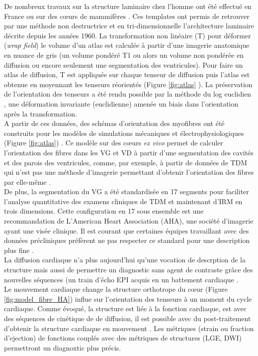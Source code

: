 De nombreux travaux sur la structure laminaire chez l’homme ont été effectué en France \cite{Lombaert2012} \cite{} ou sur des cœurs de mammifères \cite{Magat2022} \cite{Smerup2008}. Ces templates ont permis de retrouver par une méthode non destructrice et en tri-dimensionnelle l’architecture laminaire décrite depuis les années 1960\cite{STREETER1969}. La transformation non linéaire (T)  pour déformer (\textit{wrap field}) le volume d’un atlas est calculée à partir d’une imagerie anatomique en nuance de gris (un volume pondéré T1 ou alors un volume non pondérée en diffusion ou encore seulement une segmentation des ventricules).  Pour faire un atlas de diffusion, T est appliquée sur chaque tenseur de diffusion puis l’atlas est obtenue en moyennant les tenseurs réorientés (Figure \ref{fig:atlas} ). La préservation de l’orientation des tenseurs a été rendu possible par la méthode du log euclidien \cite{Arsigny2006}, une déformation invariante (euclidienne) amenée un biais dans l’orientation après la transformation.
\\
A partir de ces données, des schémas d’orientation \cite{Bayer2012} des myofibres ont été construits pour les modèles de simulations mécaniques et électrophysiologiques (Figure \ref{fig:atlas}) \cite{Chapelle2009} \cite{Sermesant2006}. Ce modèle sur des cœurs \textit{ex vivo} permet de calculer l’orientation des fibres dans les VG et VD à partir d’une segmentation des cavités et des parois des ventricules, comme, par exemple, à partir de données de TDM qui n’est pas une méthode d’imagerie permettant d’obtenir l’orientation des fibres par elle-même \cite{Sermesant2006}.
\\
De plus, la segmentation du VG a été standardisée en 17 segments \cite{Cerqueira2002} pour faciliter l’analyse quantitative des examens cliniques de TDM et maintenant d’IRM en trois dimensions.  Cette configuration en 17 sous ensemble est une recommandation de L’American Heart Association (AHA), une société d’imagerie ayant une visée clinique. Il est courant que certaines équipes travaillant avec des données précliniques préfèrent ne pas respecter ce standard pour une description plus fine \cite{GarciaCanadilla2019}.
\\
La diffusion cardiaque n’a plus aujourd’hui qu’une vocation de descrption de la structure mais aussi de permettre un diagnostic sans agent de contraste \cite{Mekkaoui2018} \cite{Watson2018} grâce des nouvelles séquences (un train d’écho EPI acquis en un battement cardiaque \cite{Moulin2015}. 
\\
Le mouvement cardiaque change la structure orthotrope du cœur (Figure \ref{fig:model_fibre_HA}) influe sur l’orientation des tenseurs à un moment du cycle cardiaque. Comme évoqué, la structure est liée à la fonction cardiaque, est avec des séquences de cinétique de de diffusion, il est possible avec du post-traitement d’obtenir la structure cardiaque en mouvement \cite{SHARRACK2022}. Les métriques (strain ou fraction d’ejection) de fonctions couplés avec des métriques de structures (LGE, DWI) permettront un diagnoxtic plus précis.

